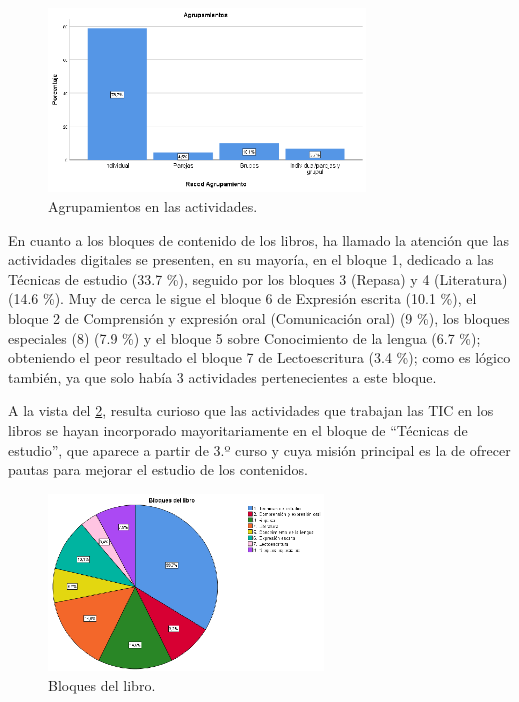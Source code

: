 \documentclass[spanish]{textolivre}
\begin{document}
\begin{figure}[htb]
 \centering
 \includegraphics[width=0.75\textwidth]{Fig04.eps}
 \caption{Agrupamientos en las actividades.}
 \label{Fig04}
\end{figure}

En cuanto a los bloques de contenido de los libros, ha llamado la atención que las actividades digitales se presenten, en su mayoría, en el bloque 1, dedicado a las Técnicas de estudio (33.7 \%), seguido por los bloques 3 (Repasa) y 4 (Literatura) (14.6 \%). Muy de cerca le sigue el bloque 6 de Expresión escrita (10.1 \%), el bloque 2 de Comprensión y expresión oral (Comunicación oral) (9 \%), los bloques especiales (8) (7.9 \%) y el bloque 5 sobre Conocimiento de la lengua (6.7 \%); obteniendo el peor resultado el bloque 7 de Lectoescritura (3.4 \%); como es lógico también, ya que solo había 3 actividades pertenecientes a este bloque. 

A la vista del \cref{Fig05}, resulta curioso que las actividades que trabajan las TIC en los libros se hayan incorporado mayoritariamente en el bloque de “Técnicas de estudio”, que aparece a partir de 3.º curso y cuya misión principal es la de ofrecer pautas para mejorar el estudio de los contenidos. 

\begin{figure}[htb]
 \centering
 \includegraphics[width=0.65\textwidth]{Fig05.eps}
 \caption{Bloques del libro.}
 \label{Fig05}
\end{figure}
\end{document}
